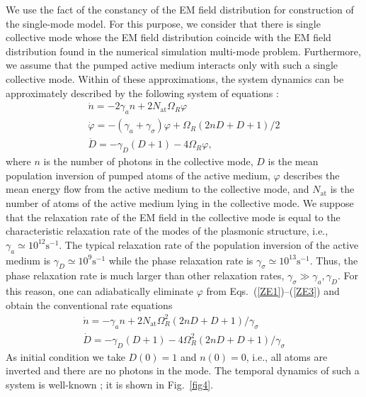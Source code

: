 \documentclass[aps,pra,amsmath,amssymb,onecolumn,superscriptaddress,showpacs,floatfix,]{revtex4-1}
\begin{document}
We use the fact of the constancy of the EM field distribution for construction of the single-mode model. For this purpose, we consider that there is single collective mode whose the EM field distribution coincide with the EM field distribution found in the numerical simulation multi-mode problem. Furthermore, we assume that the pumped active medium interacts only with such a single collective mode. Within of these approximations, the system dynamics can be approximately described by the following system of equations \cite{SiegmanLasers}:
\begin{gather} 
\dot n =  - 2{\gamma _a}n + 2{N_{\text{at}}}{\Omega _R}\varphi \label{ZE1}
\\
\dot \varphi = - \left( {{\gamma _a} + {\gamma _\sigma }} \right)\varphi + {\Omega _R}\left( {2nD + D + 1} \right)/2 \label{ZE2}
\\
\dot D =  - {\gamma _D}\left( {D + 1} \right) - 4{\Omega _R}\varphi, \label{ZE3}
\end{gather}
where $n$ is the number of photons in the collective mode, $D$ is the mean population inversion of pumped atoms of the active medium, $\varphi$ describes the mean energy flow from the active medium to the collective mode, and $N_{\text{at}}$ is the number of atoms of the active medium lying in the collective mode.
We suppose that the relaxation rate of the EM field in the collective mode is equal to the characteristic relaxation rate of the modes of the plasmonic structure, i.e., $\gamma_a \simeq 10^{12} \text{s}^{-1}$.
The typical relaxation rate of the population inversion of the active medium is $\gamma_D \simeq 10^9 \text{s}^{-1}$ while the phase relaxation rate is $\gamma_{\sigma}\simeq 10^{13} \text{s}^{-1}$.
Thus, the phase relaxation rate is much larger than other relaxation rates, $\gamma_\sigma \gg \gamma_a, \gamma_D$.
For this reason, one can adiabatically eliminate $\varphi$ from Eqs.~(\ref{ZE1})--(\ref{ZE3}) and obtain the conventional rate equations
\begin{gather} 
\dot n =  - {\gamma _a}n + 2{N_{\text{at}}}\Omega _R^2\left( {2nD + D + 1} \right)/{\gamma _\sigma } \label{RE1}
\\
\dot D =  - {\gamma _D}\left( {D + 1} \right) - 4\Omega _R^2\left( {2nD + D + 1} \right)/{\gamma _\sigma } \label{RE2}
\end{gather}
As initial condition we take $D(0) = 1$ and $n(0) = 0$, i.e., all atoms are inverted and there are no photons in the mode.
The temporal dynamics of such a system is well-known \cite{SiegmanLasers}; it is shown in Fig.~\ref{fig4}.
\end{document}
